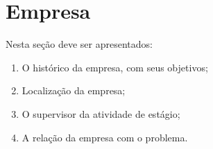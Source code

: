 

\section{Empresa}
    \label{sec:empresa}
    
    Nesta seção deve ser apresentados:
    
    \begin{enumerate}[label=\roman *.]
        \item O histórico da empresa, com seus objetivos;
        \item Localização da empresa;
        \item O supervisor da atividade de estágio;
        \item A relação da empresa com o problema.
    \end{enumerate} 
    